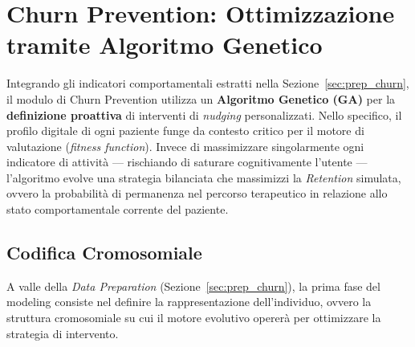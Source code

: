 \section{Churn Prevention: Ottimizzazione tramite Algoritmo Genetico}
\label{sec:churn_modeling}

Integrando gli indicatori comportamentali estratti nella Sezione~\ref{sec:prep_churn}, il modulo di Churn Prevention utilizza un \textbf{Algoritmo Genetico (GA)} per la \textbf{definizione proattiva} di interventi di \textit{nudging} \cite{thaler2008nudge} personalizzati. Nello specifico, il profilo digitale di ogni paziente funge da contesto critico per il motore di valutazione (\textit{fitness function}). Invece di massimizzare singolarmente ogni indicatore di attività --- rischiando di saturare cognitivamente l'utente --- l'algoritmo evolve una strategia bilanciata che massimizzi la \textit{Retention} simulata, ovvero la probabilità di permanenza nel percorso terapeutico in relazione allo stato comportamentale corrente del paziente.

\subsection{Codifica Cromosomiale}
A valle della \textit{Data Preparation} (Sezione~\ref{sec:prep_churn}), la prima fase del modeling consiste nel definire la rappresentazione dell'individuo, ovvero la struttura cromosomiale su cui il motore evolutivo opererà per ottimizzare la strategia di intervento.

